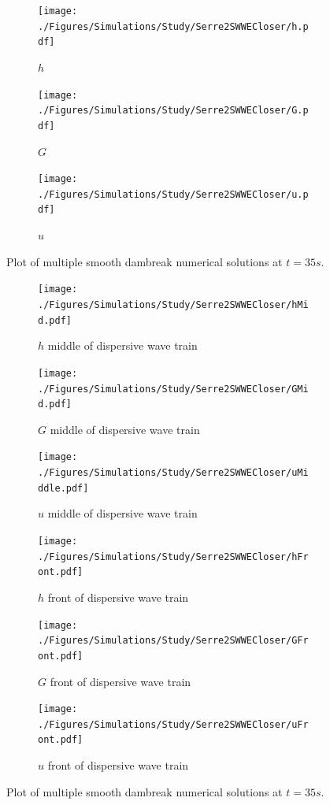 \documentclass[10pt]{article}
\begin{document}
\begin{figure}
	\centering
	\begin{subfigure}{0.32\textwidth}
		\centering
		\texttt{[image: ./Figures/Simulations/Study/Serre2SWWECloser/h.pdf]}
		\caption{$h$}
	\end{subfigure}
	\begin{subfigure}{0.32\textwidth}
		\centering
		\texttt{[image: ./Figures/Simulations/Study/Serre2SWWECloser/G.pdf]}
		\caption{$G$}
	\end{subfigure}
	\begin{subfigure}{0.32\textwidth}
	\centering
	\texttt{[image: ./Figures/Simulations/Study/Serre2SWWECloser/u.pdf]}
	\caption{$u$}
	\end{subfigure}
	\caption{Plot of multiple smooth dambreak numerical solutions at $t=35s$.}
\end{figure}



\begin{figure}
	\centering
	\begin{subfigure}{0.32\textwidth}
		\centering
		\texttt{[image: ./Figures/Simulations/Study/Serre2SWWECloser/hMid.pdf]}
		\caption{$h$ middle of dispersive wave train}
	\end{subfigure}
	\begin{subfigure}{0.32\textwidth}
		\centering
		\texttt{[image: ./Figures/Simulations/Study/Serre2SWWECloser/GMid.pdf]}
		\caption{$G$ middle of dispersive wave train}
	\end{subfigure}
	\begin{subfigure}{0.32\textwidth}
		\centering
		\texttt{[image: ./Figures/Simulations/Study/Serre2SWWECloser/uMiddle.pdf]}
		\caption{$u$ middle of dispersive wave train}
	\end{subfigure}
	\begin{subfigure}{0.32\textwidth}
	\centering
	\texttt{[image: ./Figures/Simulations/Study/Serre2SWWECloser/hFront.pdf]}
	\caption{$h$ front of dispersive wave train}
	\end{subfigure}
	\begin{subfigure}{0.32\textwidth}
		\centering
		\texttt{[image: ./Figures/Simulations/Study/Serre2SWWECloser/GFront.pdf]}
		\caption{$G$ front of dispersive wave train}
	\end{subfigure}
	\begin{subfigure}{0.32\textwidth}
		\centering
		\texttt{[image: ./Figures/Simulations/Study/Serre2SWWECloser/uFront.pdf]}
		\caption{$u$ front of dispersive wave train}
	\end{subfigure}
	\caption{Plot of multiple smooth dambreak numerical solutions at $t=35s$.}
\end{figure}
\end{document}
